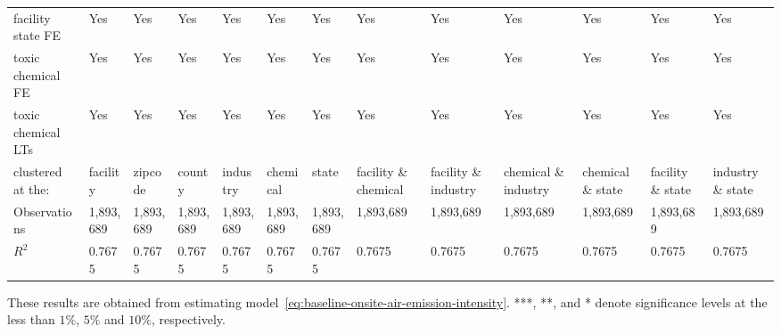 \begin{table}[H]
{\begin{tabular}{@{}lllllllllllll@{}}
            facility state FE                   & Yes       & Yes       & Yes       & Yes       & Yes       & Yes       & Yes                  & Yes                  & Yes                  & Yes               & Yes               & Yes               \\
            toxic chemical FE                   & Yes       & Yes       & Yes       & Yes       & Yes       & Yes       & Yes                  & Yes                  & Yes                  & Yes               & Yes               & Yes               \\
            toxic chemical LTs                  & Yes       & Yes       & Yes       & Yes       & Yes       & Yes       & Yes                  & Yes                  & Yes                  & Yes               & Yes               & Yes               \\\midrule\midrule
            clustered at the:                   & facility  & zipcode   & county    & industry  & chemical  & state     & facility \& chemical & facility \& industry & chemical \& industry & chemical \& state & facility \& state & industry \& state \\
            Observations                        & 1,893,689 & 1,893,689 & 1,893,689 & 1,893,689 & 1,893,689 & 1,893,689 & 1,893,689            & 1,893,689            & 1,893,689            & 1,893,689         & 1,893,689         & 1,893,689         \\
            $R^2$                               & 0.7675    & 0.7675    & 0.7675    & 0.7675    & 0.7675    & 0.7675    & 0.7675               & 0.7675               & 0.7675               & 0.7675            & 0.7675            & 0.7675            \\ \bottomrule\bottomrule
        \end{tabular}%
    }
    \begin{minipage}{18cm}
        \vspace{0.05in}
        These results are obtained from estimating model~\ref{eq:baseline-onsite-air-emission-intensity}. ***, **, and * denote significance levels at the less than $1\%$, $5\%$ and $10\%$, respectively.
    \end{minipage}
\end{table}